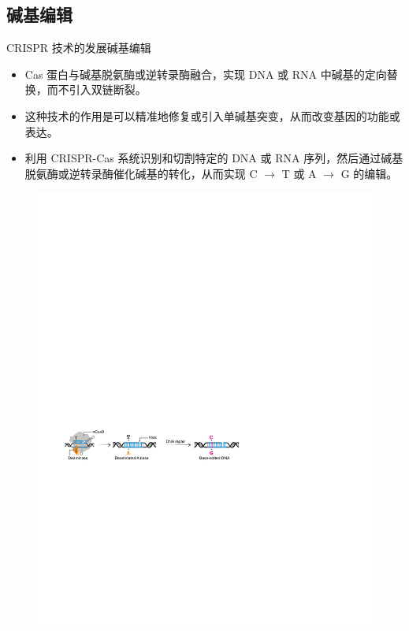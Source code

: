 \documentclass{beamer}
\begin{document}

	\subsection{碱基编辑}
	\begin{frame}{CRISPR 技术的发展}{碱基编辑}
		\begin{itemize}
			\item Cas 蛋白与碱基脱氨酶或逆转录酶融合，实现 DNA 或 RNA 中碱基的定向替换，而不引入双链断裂。
			\item  这种技术的作用是可以精准地修复或引入单碱基突变，从而改变基因的功能或表达。
			\item 利用 CRISPR-Cas 系统识别和切割特定的 DNA 或 RNA 序列，然后通过碱基脱氨酶或逆转录酶催化碱基的转化，从而实现 C $\to$ T 或 A $\to$ G 的编辑。	
		\end{itemize}

		\begin{figure}
			\centering
			\includegraphics{img/base_edit.pdf}
		\end{figure}

	\end{frame}
\end{document}
